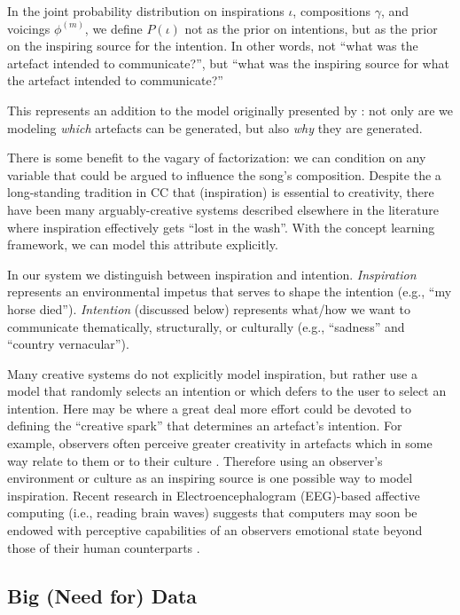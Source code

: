 \documentclass[letterpaper]{article}
\begin{document}
In the joint probability distribution on inspirations $\iota$, compositions $\gamma$, and voicings $\phi^{(m)}$, we define $P(\iota)$ not as the prior on intentions, but as the prior on the inspiring source for the intention. In other words, not ``what was the artefact intended to communicate?'', but ``what was the inspiring source for what the artefact intended to communicate?''

This represents an addition to the model originally presented by \cite{lake2015human}: not only are we modeling \textit{which} artefacts can be generated, but also \textit{why} they are generated. 

There is some benefit to the vagary of factorization: we can condition on any variable that could be argued to influence the song's composition. Despite the a long-standing tradition in CC that (inspiration) is essential to creativity, there have been many arguably-creative systems described elsewhere in the literature where inspiration effectively gets ``lost in the wash''. With the concept learning framework, we can model this attribute explicitly.

In our system we distinguish between inspiration and intention. \textit{Inspiration} represents an environmental impetus that serves to shape the intention (e.g., ``my horse died''). \textit{Intention} (discussed below) represents what/how we want to communicate thematically, structurally, or culturally (e.g., ``sadness'' and ``country vernacular'').

Many creative systems do not explicitly model inspiration, but rather use a model that randomly selects an intention or which defers to the user to select an intention. Here may be where a great deal more effort could be devoted to defining the ``creative spark'' that determines an artefact's intention. For example, observers often perceive greater creativity in artefacts which in some way relate to them or to their culture \cite{colton2008creativity}. Therefore using an observer's environment or culture as an inspiring source is one possible way to model inspiration. Recent research in Electroencephalogram (EEG)-based affective computing (i.e., reading brain waves) suggests that computers may soon be endowed with perceptive capabilities of an observers emotional state beyond those of their human counterparts \cite{volioti2016mapping}.

\subsection{Big (Need for) Data}
\end{document}
